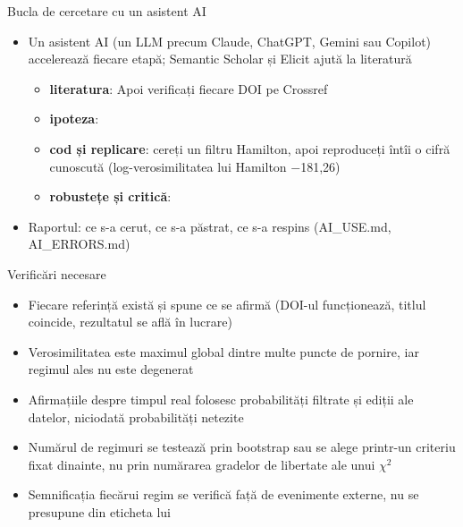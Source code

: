\begin{frame}{Bucla de cercetare cu un asistent AI}
\itemsize{\footnotesize}
\begin{itemize}
    \item Un asistent AI (un LLM precum Claude, ChatGPT, Gemini sau Copilot) accelerează fiecare etapă; Semantic Scholar și Elicit ajută la literatură
    \begin{itemize}
        \item \textbf{literatura}:  Apoi verificați fiecare DOI pe Crossref
        \item \textbf{ipoteza}: 
        \item \textbf{cod și replicare}: cereți un filtru Hamilton, apoi reproduceți întîi o cifră cunoscută (log-verosimilitatea lui Hamilton \ensuremath{-}181{,}26)
        \item \textbf{robustețe și critică}: 
    \end{itemize}
    \item Raportul: ce s-a cerut, ce s-a păstrat, ce s-a respins (AI\_USE.md, AI\_ERRORS.md)
\end{itemize}
\end{frame}

\begin{frame}{Verificări necesare}
\itemsize{\small}
\begin{itemize}
    \item Fiecare referință există și spune ce se afirmă (DOI-ul funcționează, titlul coincide, rezultatul se află în lucrare)
    \item Verosimilitatea este maximul global dintre multe puncte de pornire, iar regimul ales nu este degenerat
    \item Afirmațiile despre timpul real folosesc probabilități filtrate și ediții ale datelor, niciodată probabilități netezite
    \item Numărul de regimuri se testează prin bootstrap sau se alege printr-un criteriu fixat dinainte, nu prin numărarea gradelor de libertate ale unui $\chi^2$
    \item Semnificația fiecărui regim se verifică față de evenimente externe, nu se presupune din eticheta lui
\end{itemize}
\end{frame}

